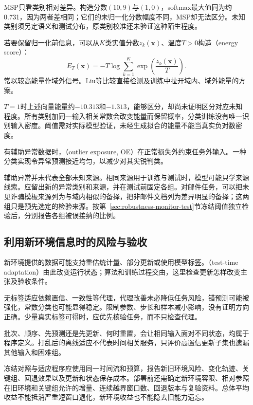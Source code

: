 MSP只看类别相对差异。构造分数$(10,9)$与$(1,0)$，softmax最大值同为约0.731，因为两者差相同；它们的未归一化分数幅度不同，MSP却无法区分。未知类别须另定语义和测试分布，原类别校准还未验证这种陌生程度。

若要保留归一化前信息，可以从$K$类实值分数$z_k(\bm{x})$、温度$T>0$构造（energy score）：
\begin{equation}
 E_T(\bm{x})=-T\log\sum_{k=1}^{K}
       \exp\!\left(\frac{z_k(\bm{x})}{T}\right).
 \label{eq:robustness-energy}
\end{equation}
常以较高能量作域外信号。Liu等比较直接检测及训练中拉开域内、域外能量的方案。

$T=1$时上述向量能量约$-10.313$和$-1.313$，能够区分，却尚未证明区分对应未知程度。所有类别加同一输入相关常数会改变能量而保留概率，分类训练没有唯一识别输入密度。阈值需对实际模型验证，未经生成拟合的能量不能当真实负对数密度。

有辅助异常数据时，（outlier exposure, OE）在正常损失外约束任务外输入。一种分类实现令异常预测接近均匀，以减少对其尖锐判类。

辅助异常并未代表全部未知来源。相同来源用于训练与测试时，模型可能只学来源线索。应留出新的异常类别和来源，并在测试前固定各组。对邮件任务，可以把未见诈骗模板来源列为与域内相似的备择，把非邮件文档列为差异明显的备择；这两组只是预先选定的检验来源。按第~\ref{sec:robustness-monitor-test}节冻结阈值独立检验后，分别报告各组被误接纳的比例。

\subsection{利用新环境信息时的风险与验收}
\label{sec:robustness-adaptation}

新环境提供的数据可能支持重估统计量、部分更新或使用模型标签。（test-time adaptation）由此改变运行状态；算法和训练过程交由，这里检查更新怎样改变主张及验收条件。

无标签适应依赖置信、一致性等代理，代理改善未必降低任务风险，错预测可能被强化，常数分类也可能显得稳定。限制参数、步长和样本减小影响，没有证明方向正确。少量真实标签可得时，应优先核验任务，而不只检查代理。

批次、顺序、先预测还是先更新、何时重置，会让相同输入面对不同状态，均属于程序定义。打乱后的离线适应不代表时间相关服务，只评价高置信更新子集也遗漏其他输入和困难组。

冻结对照与适应程序应使用同一时间流和预算，报告新旧环境风险、变化轨迹、关键组、回退效果以及更新和状态保存成本。部署前还需确定新环境容限、相对参照在旧环境和关键组允许的增量、连续越界窗口数、回退版本与复验资料。总体平均收益不能抵消严重短窗口退化，新环境收益也不能隐去旧能力遗忘。

